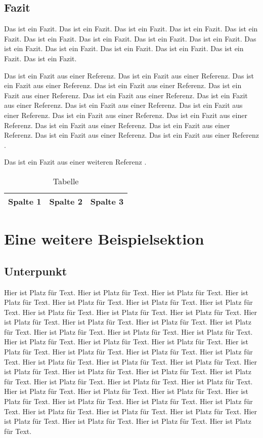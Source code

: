 \subsection{Fazit}
Das ist ein Fazit. Das ist ein Fazit. Das ist ein Fazit. Das ist ein Fazit. Das ist ein Fazit. Das ist ein Fazit. Das ist ein Fazit. Das ist ein Fazit. Das ist ein Fazit. Das ist ein Fazit. Das ist ein Fazit. Das ist ein Fazit. Das ist ein Fazit. Das ist ein Fazit. Das ist ein Fazit.

Das ist ein Fazit aus einer Referenz. Das ist ein Fazit aus einer Referenz. Das ist ein Fazit aus einer Referenz. Das ist ein Fazit aus einer Referenz. Das ist ein Fazit aus einer Referenz. Das ist ein Fazit aus einer Referenz. Das ist ein Fazit aus einer Referenz. Das ist ein Fazit aus einer Referenz. Das ist ein Fazit aus einer Referenz. Das ist ein Fazit aus einer Referenz. Das ist ein Fazit aus einer Referenz. Das ist ein Fazit aus einer Referenz. Das ist ein Fazit aus einer Referenz. Das ist ein Fazit aus einer Referenz. Das ist ein Fazit aus einer Referenz \cite{000:Reference}.

Das ist ein Fazit aus einer weiteren Referenz \cite{001:Reference}.

\begin{table}
	\centering
	\begin{tabulary}{\textwidth}{|L|L|L|}
		\hline
		Spalte 1 & Spalte 2 & Spalte 3 \\\hline
	\end{tabulary}
	\caption{Tabelle}
\end{table}

\section{Eine weitere Beispielsektion}

\subsection{Unterpunkt}
Hier ist Platz für Text. Hier ist Platz für Text. Hier ist Platz für Text. Hier ist Platz für Text. Hier ist Platz für Text. Hier ist Platz für Text. Hier ist Platz für Text. Hier ist Platz für Text. Hier ist Platz für Text. Hier ist Platz für Text. Hier ist Platz für Text. Hier ist Platz für Text. Hier ist Platz für Text. Hier ist Platz für Text. Hier ist Platz für Text. Hier ist Platz für Text. Hier ist Platz für Text. Hier ist Platz für Text. Hier ist Platz für Text. Hier ist Platz für Text. Hier ist Platz für Text. Hier ist Platz für Text. Hier ist Platz für Text. Hier ist Platz für Text. Hier ist Platz für Text. Hier ist Platz für Text. Hier ist Platz für Text. Hier ist Platz für Text. Hier ist Platz für Text. Hier ist Platz für Text. Hier ist Platz für Text. Hier ist Platz für Text. Hier ist Platz für Text. Hier ist Platz für Text. Hier ist Platz für Text. Hier ist Platz für Text. Hier ist Platz für Text. Hier ist Platz für Text. Hier ist Platz für Text. Hier ist Platz für Text. Hier ist Platz für Text. Hier ist Platz für Text. Hier ist Platz für Text. Hier ist Platz für Text. Hier ist Platz für Text. Hier ist Platz für Text. Hier ist Platz für Text. Hier ist Platz für Text.

